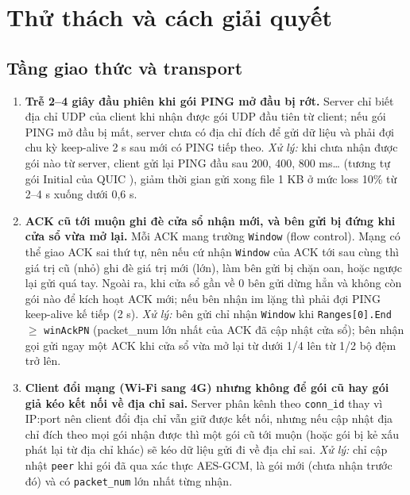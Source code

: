 \section{Thử thách và cách giải quyết}
\label{sec:thu-thach}

\subsection{Tầng giao thức và transport}
\begin{enumerate}[label=\textbf{\arabic*.}, ref=\arabic*, leftmargin=*, itemsep=2pt]
  \item \label{tt:ping-dau}\textbf{Trễ 2--4 giây đầu phiên khi gói PING mở đầu bị rớt.} Server chỉ biết địa chỉ
        UDP của client khi nhận được gói UDP đầu tiên từ client; nếu gói PING mở đầu bị mất, server chưa có địa chỉ
        đích để gửi dữ liệu và phải đợi chu kỳ keep-alive 2 s sau mới có PING tiếp theo. \emph{Xử lý:} khi chưa nhận
        được gói nào từ server, client gửi lại PING đầu sau 200, 400, 800 ms\dots{} (tương tự gói Initial của QUIC
        \cite{rfc9002}), giảm thời gian gửi xong file 1 KB ở mức loss 10\% từ 2--4 s xuống dưới 0,6 s.
  \item \textbf{ACK cũ tới muộn ghi đè cửa sổ nhận mới, và bên gửi bị đứng khi cửa sổ vừa mở lại.} Mỗi ACK mang
        trường \texttt{Window} (flow control). Mạng có thể giao ACK sai thứ tự, nên nếu cứ nhận \texttt{Window} của
        ACK tới sau cùng thì giá trị cũ (nhỏ) ghi đè giá trị mới (lớn), làm bên gửi bị chặn oan, hoặc ngược lại gửi
        quá tay. Ngoài ra, khi cửa sổ gần về 0 bên gửi dừng hẳn và không còn gói nào để kích hoạt ACK mới; nếu bên nhận
        im lặng thì phải đợi PING keep-alive kế tiếp (2 s). \emph{Xử lý:} bên gửi chỉ nhận \texttt{Window} khi
        \texttt{Ranges[0].End} $\ge$ \texttt{winAckPN} (packet\_num lớn nhất của ACK đã cập nhật cửa sổ); bên nhận gọi
         gửi ngay một ACK khi cửa sổ vừa mở lại từ dưới 1/4 lên từ 1/2 bộ đệm trở lên.
  \item \textbf{Client đổi mạng (Wi-Fi sang 4G) nhưng không để gói cũ hay gói giả kéo kết nối về địa chỉ sai.}
        Server phân kênh theo \texttt{conn\_id} thay vì IP:port nên client đổi địa chỉ vẫn giữ được kết nối, nhưng
        nếu cập nhật địa chỉ đích theo mọi gói nhận được thì một gói cũ tới muộn (hoặc gói bị kẻ xấu phát lại từ địa
        chỉ khác) sẽ kéo dữ liệu gửi đi về địa chỉ sai. \emph{Xử lý:} chỉ cập nhật \texttt{peer} khi gói đã qua xác
        thực AES-GCM, là gói mới (chưa nhận trước đó) và có \texttt{packet\_num} lớn nhất từng nhận.
\end{enumerate}
